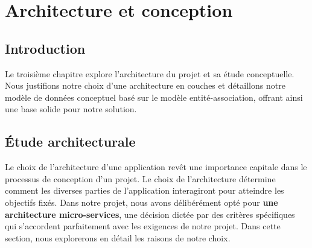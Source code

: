 \chapter{Architecture et conception}

\section*{Introduction}
    \par Le troisième chapitre explore l'architecture du projet et sa étude conceptuelle. Nous justifions notre choix d'une architecture en couches et détaillons notre modèle de données conceptuel basé sur le modèle entité-association, offrant ainsi une base solide pour notre solution.

\section{Étude architecturale}
\par Le choix de l'architecture d'une application revêt une importance capitale dans le processus de conception d'un projet. 
Le choix de l'architecture détermine comment les diverses parties de l'application interagiront pour atteindre les objectifs fixés.
Dans notre projet, nous avons délibérément opté pour \textbf{une architecture micro-services}, une décision dictée par des critères spécifiques qui s'accordent parfaitement avec les exigences de notre projet.
Dans cette section, nous explorerons en détail les raisons de notre choix.
